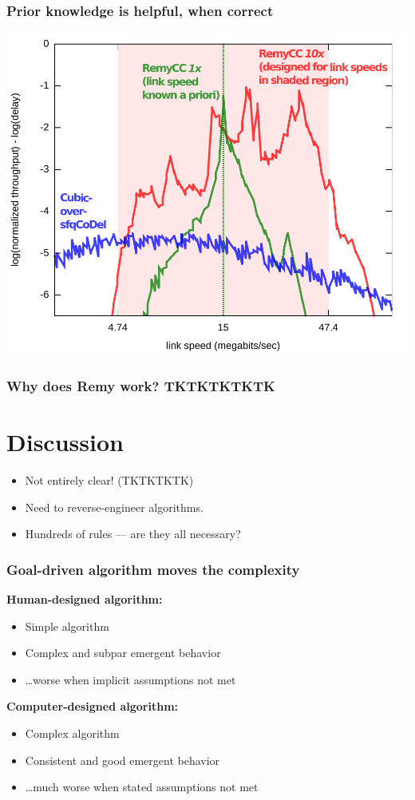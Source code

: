 \documentclass[svgnames]{beamer}
\begin{document}
\begin{frame}
\frametitle{Prior knowledge is helpful, when correct}

\noindent \includegraphics[width=8.5 cm]{spec2.pdf}

\end{frame}

\begin{frame}
\frametitle{Why does Remy work? TKTKTKTKTK}

\section{Discussion}

\begin{itemize}
\item Not entirely clear! (TKTKTKTK)

\item Need to reverse-engineer algorithms.

\item Hundreds of rules --- are they all necessary?
\end{itemize}

\end{frame}

\begin{frame}
\frametitle{Goal-driven algorithm \textbf{moves} the complexity}

\textbf{Human-designed algorithm:}

\begin{itemize}
\item Simple algorithm
\item Complex and subpar emergent behavior
\item \ldots worse when implicit assumptions not met
\end{itemize}

\textbf{Computer-designed algorithm:}

\begin{itemize}
\item Complex algorithm
\item Consistent and good emergent behavior
\item \ldots much worse when stated assumptions not met
\end{itemize}

\end{frame}
\end{document}
